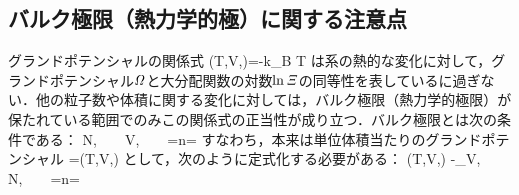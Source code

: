 \subsection{バルク極限（熱力学的極）に関する注意点}
グランドポテンシャルの関係式
\be
{\it\Omega}(T,V,\mu)=-k_{\rm{B}} T\ln{{\it{\Xi}}}
\ee
は系の熱的な変化に対して，グランドポテンシャル${\it\Omega}$と大分配関数の対数$\ln{{\it{\Xi}}}$の同等性を表しているに過ぎない．他の粒子数や体積に関する変化に対しては，バルク極限（熱力学的極限）が保たれている範囲でのみこの関係式の正当性が成り立つ．バルク極限とは次の条件である：
\be
N\to\infty,\ \ \ \ 
V\to\infty,\ \ \ \ 
=n=
\ee
すなわち，本来は単位体積当たりのグランドポテンシャル
\be
{}=\omega(T,V,\mu)
\ee
として，次のように定式化する必要がある：
\be
\omega(T,V,\mu)
\equiv
-\lim_{V\to\infty}\ln{{\it{\Xi}}},\ \ \ \ 
N\to\infty,\ \ \ \ 
=n=
\ee
